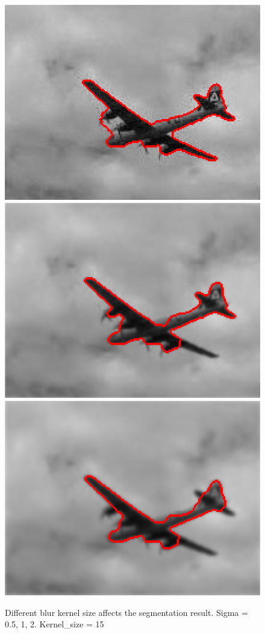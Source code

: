\documentclass{article}
\begin{document}
\begin{figure}[H]
\caption{Different blur kernel size affects the segmentation result. Sigma = 0.5, 1, 2. Kernel\_size = 15}
\begin{center}
\includegraphics[scale=.3]{blur05.png}
\includegraphics[scale=.3]{blur1.png}
\includegraphics[scale=.3]{blur2.png}
\end{center}
\end{figure}
\end{document}
